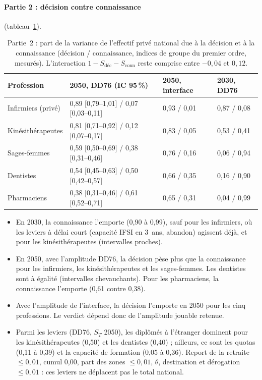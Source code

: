 \paragraph{Partie 2 : décision contre connaissance} (tableau~\ref{sen:tab:groupes}).

\begin{table}[h]
\centering\small
\begin{tabular}{llll}
\toprule
Profession & 2050, DD76 (IC 95\,\%) & 2050, interface & 2030, DD76 \\
\midrule
Infirmiers (privé) & 0,89 [0,79--1,01] / 0,07 [0,03--0,11] & 0,93 / 0,01 & 0,87 / 0,08 \\
Kinésithérapeutes & 0,81 [0,71--0,92] / 0,12 [0,07--0,17] & 0,83 / 0,05 & 0,53 / 0,41 \\
Sages-femmes & 0,59 [0,50--0,69] / 0,38 [0,31--0,46] & 0,76 / 0,16 & 0,06 / 0,94 \\
Dentistes & 0,54 [0,45--0,63] / 0,50 [0,42--0,57] & 0,66 / 0,35 & 0,16 / 0,90 \\
Pharmaciens & 0,38 [0,31--0,46] / 0,61 [0,52--0,71] & 0,65 / 0,31 & 0,04 / 0,99 \\
\bottomrule
\end{tabular}
\caption{Partie~2 : part de la variance de l'effectif privé national due à la décision et à la connaissance
(décision / connaissance, indices de groupe du premier ordre, mesurés\mesure{}). L'interaction
$1 - S_{\text{déc}} - S_{\text{conn}}$ reste comprise entre $-0{,}04$ et $0{,}12$\mesure{}.}
\label{sen:tab:groupes}
\end{table}

\begin{itemize}
  \item En 2030, la connaissance l'emporte (0,90 à 0,99\mesure{}), sauf pour les infirmiers, où les leviers à délai
        court (capacité IFSI en 3~ans, abandon) agissent déjà, et pour les kinésithérapeutes (intervalles proches).
  \item En 2050, avec l'amplitude DD76, la décision pèse plus que la connaissance pour les infirmiers, les
        kinésithérapeutes et les sages-femmes. Les dentistes sont à égalité (intervalles chevauchants). Pour les
        pharmaciens, la connaissance l'emporte (0,61 contre 0,38\mesure{}).
  \item Avec l'amplitude de l'interface, la décision l'emporte en 2050 pour les cinq professions. Le verdict dépend
        donc de l'amplitude jouable retenue.
  \item Parmi les leviers (DD76, $S_T$ 2050), les diplômés à l'étranger dominent pour les kinésithérapeutes
        (0,50\mesure{}) et les dentistes (0,40\mesure{}) ; ailleurs, ce sont les quotas (0,11 à 0,39\mesure{}) et la
        capacité de formation (0,05 à 0,36\mesure{}). Report de la retraite $\le 0{,}01$, cumul 0,00, part des zones
        $\le 0{,}01$, $\theta$, destination et dérogation $\le 0{,}01$\mesure{} : ces leviers ne déplacent pas le total
        national.
\end{itemize}

